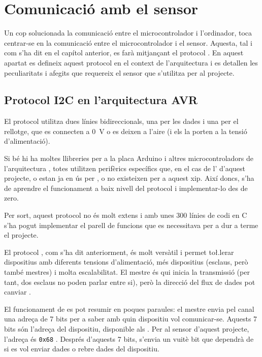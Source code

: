 \section{Comunicació amb el sensor}

Un cop solucionada la comunicació entre el microcontrolador i l'ordinador, toca
centrar-se en la comunicació entre el microcontrolador i el sensor. Aquesta, tal
i com s'ha dit en el capítol anterior, es farà mitjançant el protocol .
En aquest apartat es defineix aquest protocol en el context de l'arquitectura
 i es detallen les peculiaritats i afegits que requereix el sensor que
s'utilitza per al projecte.

\subsection{Protocol I2C en l'arquitectura AVR}

El protocol  utilitza dues línies bidireccionals, una per les dades i una per
el rellotge, que es connecten a \SI[round-mode=places,round-precision=0]{0}{\volt}
o es deixen a l'aire (i els  la porten a la tensió d'alimentació).

Si bé hi ha moltes llibreries per a la placa Arduino i altres microcontroladors
de l'arquitectura , totes utilitzen perifèrics específics que, en el
cas de l' d'aquest projecte, o estan ja en ús per , o
no existeixen per a aquest xip. Així doncs, s'ha de aprendre el funcionament a
baix nivell del protocol i implementar-lo des de zero.

Per sort, aquest protocol no és molt extens i amb unes 300 línies de codi en C
s'ha pogut implementar el parell de funcions que es necessitava per a dur a
terme el projecte.

El protocol , com s'ha dit anteriorment, és molt versàtil i permet 
to\l.lerar dispositius amb diferents tensions d'alimentació, més dispositius
(esclaus, però també mestres) i molta escalabilitat. El mestre és qui inicia
la transmissió (per tant, dos esclaus no poden parlar entre si), però la
direcció del flux de dades pot canviar \cite{I2c}.

El funcionament de  es pot resumir en poques paraules: el mestre envia
pel canal una adreça de 7 bits per a saber amb quin dispositiu vol comunicar-se.
Aquests 7 bits són l'adreça del dispositiu, disponible als . Per
al sensor d'aquest projecte, l'adreça és \texttt{0x68} \cite{MPU6050reg}.
Després d'aquests 7 bits,
s'envia un vuitè bit que dependrà de si es vol enviar dades o rebre dades del
dispositiu.

